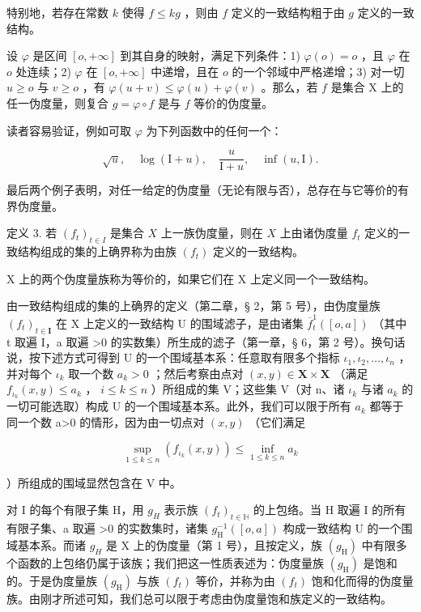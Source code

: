 特别地，若存在常数 \(k\) 使得 \(f \leqslant kg\) ，则由 \(f\) 定义的一致结构粗于由 \(g\) 定义的一致结构。

设 \(\varphi\) 是区间 \([o, +\infty]\) 到其自身的映射，满足下列条件：1) \(\varphi(o) = o\) ，且 \(\varphi\) 在 \(o\) 处连续；2) \(\varphi\) 在 \([o, +\infty]\) 中递增，且在 \(o\) 的一个邻域中严格递增；3) 对一切 \(u \geqslant o\) 与 \(v \geqslant o\) ，有 \(\varphi(u + v) \leqslant \varphi(u) + \varphi(v)\) 。那么，若 \(f\) 是集合 X 上的任一伪度量，则复合 \(g = \varphi \circ f\) 是与 \(f\) 等价的伪度量。

读者容易验证，例如可取 \(\varphi\) 为下列函数中的任何一个：

\[
\sqrt {u}, \quad \log (\mathrm{I} + u), \quad \frac {u}{\mathrm{I} + u}, \quad \inf (u, \mathrm{I}).
\]

最后两个例子表明，对任一给定的伪度量（无论有限与否），总存在与它等价的有界伪度量。

定义 3. 若 \((f_{t})_{t\in I}\) 是集合 \(X\) 上一族伪度量，则在 \(X\) 上由诸伪度量 \(f_{t}\) 定义的一致结构组成的集的上确界称为由族 \((f_{t})\) 定义的一致结构。

X 上的两个伪度量族称为等价的，如果它们在 X 上定义同一个一致结构。

由一致结构组成的集的上确界的定义（第二章，§ 2，第 5 号），由伪度量族 \((f_{t})_{t\in\mathbf{I}}\) 在 X 上定义的一致结构 U 的围域滤子，是由诸集 \(\overline{f}_{t}^{1}([o,a])\) （其中 t 取遍 I，a 取遍 \textgreater0 的实数集）所生成的滤子（第一章，§ 6，第 2 号）。换句话说，按下述方式可得到 U 的一个围域基本系：任意取有限多个指标 \(\iota_{1},\iota_{2},\ldots,\iota_{n}\) ，并对每个 \(\iota_{k}\) 取一个数 \(a_{k}>0\) ；然后考察由点对 \((x,y)\in\mathbf{X}\times\mathbf{X}\) （满足 \(f_{\iota_{k}}(x,y)\leqslant a_{k}\) ， \(i\leqslant k\leqslant n\) ）所组成的集 V；这些集 V（对 n、诸 \(\iota_{k}\) 与诸 \(a_{k}\) 的一切可能选取）构成 U 的一个围域基本系。此外，我们可以限于所有 \(a_{k}\) 都等于同一个数 a\textgreater0 的情形，因为由一切点对 \((x,y)\) （它们满足

\[
\sup _ {1 \leqslant k \leqslant n} \left(f _ {\iota_ {k}} (x, y)\right) \leqslant \inf _ {1 \leqslant k \leqslant n} a _ {k}
\]

）所组成的围域显然包含在 V 中。

对 I 的每个有限子集 H，用 \(g_{H}\) 表示族 \((f_{t})_{t\in\mathbb{H}}\) 的上包络。当 H 取遍 I 的所有有限子集、a 取遍 \textgreater0 的实数集时，诸集 \(g_{\mathrm{H}}^{-1}([o,a])\) 构成一致结构 U 的一个围域基本系。而诸 \(g_{H}\) 是 X 上的伪度量（第 1 号），且按定义，族 \((g_{\mathrm{H}})\) 中有限多个函数的上包络仍属于该族；我们把这一性质表述为：伪度量族 \((g_{\mathrm{H}})\) 是饱和的。于是伪度量族 \((g_{\mathrm{H}})\) 与族 \((f_{t})\) 等价，并称为由 \((f_{t})\) 饱和化而得的伪度量族。由刚才所述可知，我们总可以限于考虑由伪度量饱和族定义的一致结构。

